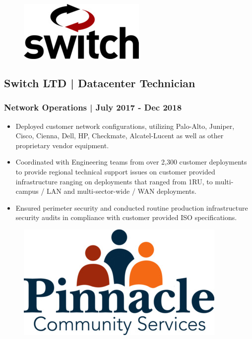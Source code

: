 \documentclass[letter,10pt]{article}
\begin{document}
\begin{figure}
\includegraphics[width=0.8\linewidth]{./img/50p_cr_switch.jpg}
\end{figure}

\subsection*{Switch LTD | Datacenter Technician}
\label{sec:orgf28dceb}
\subsubsection*{Network Operations | July 2017 - Dec 2018}
\label{sec:orgfc6d2a0}
\begin{itemize}
\item Deployed customer network configurations, utilizing Palo-Alto, Juniper, Cisco, Cienna, Dell, HP, Checkmate, Alcatel-Lucent as well as other proprietary vendor equipment.
\item Coordinated with Engineering teams from over 2,300 customer deployments to provide regional technical support issues on customer provided infrastructure ranging on deployments that ranged from 1RU, to multi-campus / LAN and multi-sector-wide / WAN deployments.
\item Ensured perimeter security and conducted routine production infrastructure security audits in compliance with customer provided ISO specifications.
\end{itemize}




\begin{figure}
\includegraphics[width=0.8\linewidth]{./img/50p_cr_pinnacle.jpg}
\end{figure}
\end{document}
